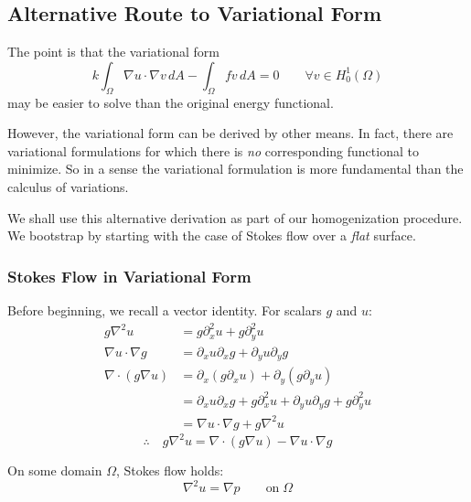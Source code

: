 \documentclass[12pt, a4paper, twoside, openright]{book}
\begin{document}
\subsection*{Alternative Route to Variational Form}

The point is that the variational form
\begin{equation}
k \int_{\Omega} \nabla u \cdot \nabla v \,dA  - \int_{\Omega} f v \,dA = 0
\qquad
\forall v \in H_0^1(\Omega)
\end{equation}
may be easier to solve than the original energy functional.

However, the variational form can be derived by other means.  In fact, there are variational formulations for which there is \emph{no} corresponding functional to minimize.  So in a sense the variational formulation is more fundamental than the calculus of variations.

We shall use this alternative derivation as part of our homogenization procedure.  We bootstrap by starting with the case of Stokes flow over a \emph{flat} surface.

\subsubsection*{Stokes Flow in Variational Form}

Before beginning, we recall a vector identity.  For scalars $g$ and $u$:
\begin{align*}
g \nabla^2 u & = g \partial_x^2 u + g \partial_y^2 u \\
\nabla u \cdot \nabla g & = \partial_x u \partial_x g + \partial_y u \partial_y g \\
\nabla \cdot (g \nabla u) & = \partial_x (g \partial_x u) + \partial_y (g \partial_y u) \\
  & = \partial_x u \partial_x g + g \partial_x^2 u + \partial_y u \partial_y g + g \partial_y^2 u \\ 
  & = \nabla u \cdot \nabla g + g \nabla^2 u 
\end{align*}
\begin{equation*}
\therefore \quad g \nabla^2 u = \nabla \cdot (g \nabla u) - \nabla u \cdot \nabla g
\end{equation*}

\vspace{2em}

On some domain $\Omega$, Stokes flow holds:
\begin{equation}
\nabla^2 u = \nabla p \qquad \text{on} \; \Omega
\end{equation}
\end{document}

